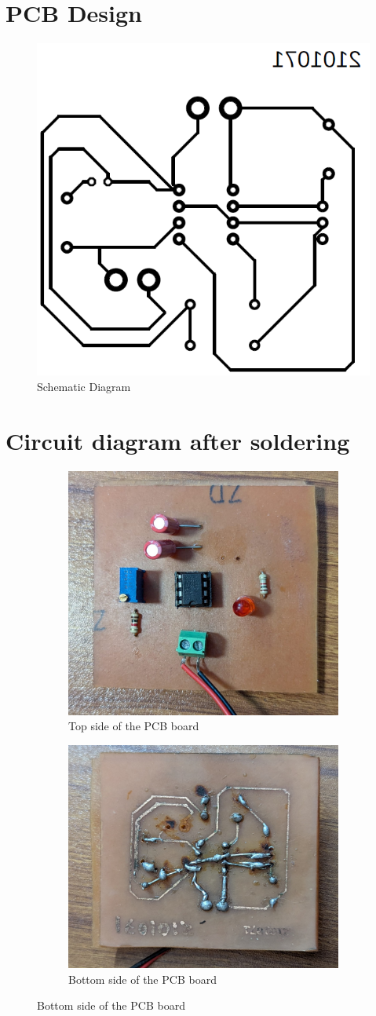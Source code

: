 \documentclass[a4paper,12pt]{article}
\begin{document}
\section{PCB Design}
	\begin{figure}[H]
	\centering
	\includegraphics[width=0.51\linewidth]{"Images/2"}
	\caption{Schematic Diagram}
\end{figure}
\section{Circuit diagram after soldering}
	\begin{figure}[H]
	\centering
		\begin{subfigure}[t]{1\textwidth}
		\centering
		\includegraphics[width=0.5\linewidth]{Images/4}
		\caption{ Top side of the PCB board}
		\vspace{2cm}
	\end{subfigure}
	
	\begin{subfigure}[t]{1\textwidth}
		\centering
		\includegraphics[width=0.5\linewidth]{Images/3}
		\caption{ Bottom side of the PCB board}
	\end{subfigure}
\end{figure}
\end{document}
